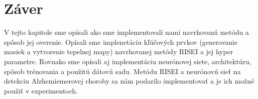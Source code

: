 \section{Záver}

V tejto kapitole sme opísali ako sme implementovali nami navrhovanú metódu a spôsob jej overenie. Opísali sme implenetáciu kľúčových prvkov (generovanie masiek a vytvorenie tepelnej mapy) navrhovanej metódy RISEI a jej hyper parametre. Rovnako sme opísali aj implementáciu neurónovej siete, architektúru, spôsob trénovania a použitú dátovú sadu. Metódu RISEI a neurónovú sieť na detekciu Alzhemiemerovej choroby sa nám podarilo implementovať a je ich možné použiť v experimentoch.
